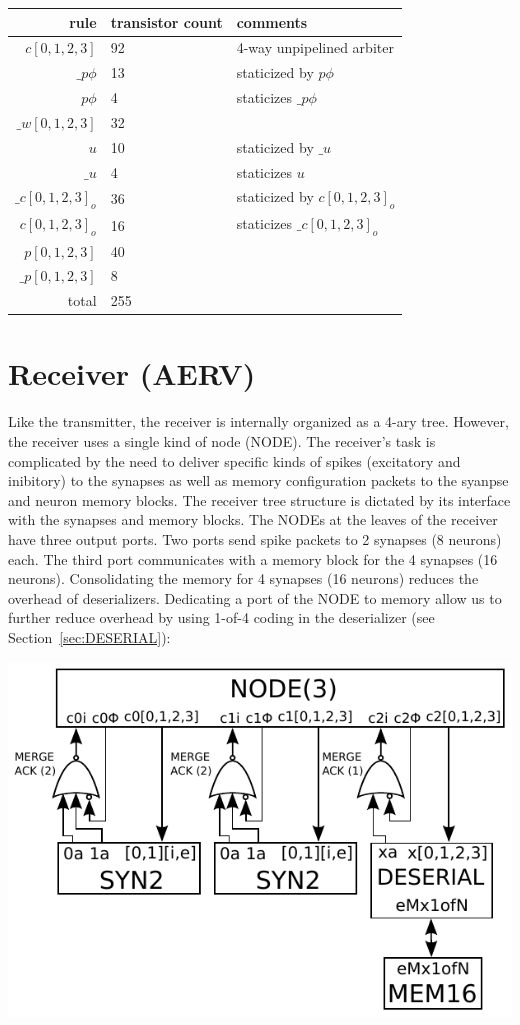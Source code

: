 \documentclass{article}
\begin{document}
\begin{center}
    \begin{tabular}{|r|l|l|}
    \hline
    rule & transistor count & comments \\ \hline
    $c[0,1,2,3]$ & 92 & 4-way unpipelined arbiter \\ \hline
    $\_p\phi$ & 13 & staticized by $p\phi$ \\ \hline
    $p\phi$ & 4 & staticizes $\_p\phi$ \\ \hline
    $\_w[0,1,2,3]$ & 32 & \\ \hline
    $u$ & 10 & staticized by $\_u$ \\ \hline
    $\_u$ & 4 & staticizes $u$ \\ \hline
    $\_c[0,1,2,3]_o$ & 36 & staticized by $c[0,1,2,3]_o$ \\ \hline
    $c[0,1,2,3]_o$ & 16 & staticizes $\_c[0,1,2,3]_o$\\ \hline
    $p[0,1,2,3]$ & 40 & \\ \hline
    $\_p[0,1,2,3]$ & 8 & \\ \hline
    \hline total & 255 & \\ \hline
    \end{tabular}
\end{center}

\section{Receiver (AERV) \label{sec:AERV}}

Like the transmitter, the receiver is internally organized as a 4-ary tree.
However, the receiver uses a single kind of node (NODE).
The receiver's task is complicated by the need to deliver specific kinds
of spikes (excitatory and inibitory) to the synapses as well as memory 
configuration packets to the syanpse and neuron memory blocks.
The receiver tree structure is dictated by its interface with the synapses and 
memory blocks. The NODEs at the leaves of the receiver have three output ports. 
Two ports send spike packets to 2 synapses (8 neurons) each. The third port
communicates with a memory block for the 4 synapses (16 neurons).
Consolidating the memory for 4 synapses (16 neurons) reduces the overhead of 
deserializers. Dedicating a port of the NODE to memory allow us to further 
reduce overhead by using 1-of-4 coding in the deserializer 
(see Section~\ref{sec:DESERIAL}):

\begin{center}
  \includegraphics[width=.5\textwidth]{img/recv_nrn_interface_2syn2_1mem16.pdf}
\end{center}
\end{document}
